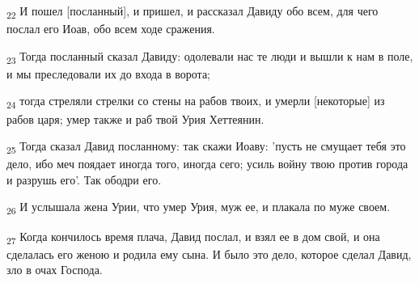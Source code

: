 \begin{tcolorbox}
\textsubscript{22} И пошел [посланный], и пришел, и рассказал Давиду обо всем, для чего послал его Иоав, обо всем ходе сражения.
\end{tcolorbox}
\begin{tcolorbox}
\textsubscript{23} Тогда посланный сказал Давиду: одолевали нас те люди и вышли к нам в поле, и мы преследовали их до входа в ворота;
\end{tcolorbox}
\begin{tcolorbox}
\textsubscript{24} тогда стреляли стрелки со стены на рабов твоих, и умерли [некоторые] из рабов царя; умер также и раб твой Урия Хеттеянин.
\end{tcolorbox}
\begin{tcolorbox}
\textsubscript{25} Тогда сказал Давид посланному: так скажи Иоаву: 'пусть не смущает тебя это дело, ибо меч поядает иногда того, иногда сего; усиль войну твою против города и разрушь его'. Так ободри его.
\end{tcolorbox}
\begin{tcolorbox}
\textsubscript{26} И услышала жена Урии, что умер Урия, муж ее, и плакала по муже своем.
\end{tcolorbox}
\begin{tcolorbox}
\textsubscript{27} Когда кончилось время плача, Давид послал, и взял ее в дом свой, и она сделалась его женою и родила ему сына. И было это дело, которое сделал Давид, зло в очах Господа.
\end{tcolorbox}
